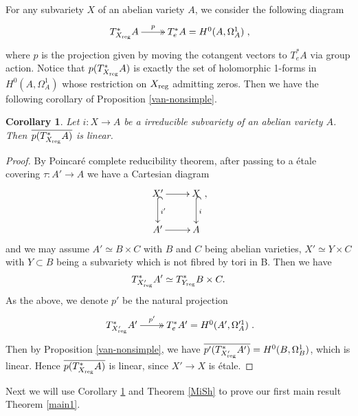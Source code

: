 \documentclass[a4paper,12pt,reqno]{amsart}
\theoremstyle{plain}
\newtheorem{corollary}[theorem]{Corollary}
\theoremstyle{remark}
\renewcommand{\cong}{\simeq}
\begin{document}
For any subvariety $X$ of an abelian variety $A$, we consider the following diagram 
$$\xymatrix{
T^*_{X_{\textnormal{reg}}}A\ar@{->>}[r]^-p& T^*_e A=H^0(A, \Omega_A^1)
},$$ where $p$ is the projection given by moving the cotangent vectors to $T^*_eA$ via group action. Notice that $p(T^*_{X_{\textnormal{reg}}}A)$ is exactly the set of holomorphic 1-forms in $H^0(A, \Omega_A^1)$ whose restriction on $X_{\textnormal{reg}}$ admitting zeros. Then we have the following corollary of Proposition \ref{van-nonsimple}.

\begin{corollary}\label{Main-coro}
Let $i: X\to A$ be a irreducible subvariety of an abelian variety $A$. Then $\overline{p(T^*_{X_{\textnormal{reg}}}A)}$ is linear. 
\end{corollary}


\begin{proof}
By Poincar\'e complete reducibility theorem, after passing to a \'etale covering $\tau:A'\to A$ we have a Cartesian diagram 
$$\xymatrix{
X'\ar[r]\ar@{^{(}->}[d]^-{i'}& X\ar@{^{(}->}[d]^-{i}\\
A'\ar[r]& A},$$ and we may assume $A'\cong B\times C$ with $B$ and $C$ being abelian varieties, $X'\cong Y\times C$ with $Y\subset B$ being a subvariety which is not fibred by tori in B. Then we have $$T^*_{X'_{\textnormal{reg}}}A'\cong T^*_{Y_{\textnormal{reg}}}B\times C.$$ As the above, we denote $p'$ be the natural projection $$\xymatrix{
T^*_{X'_{\textnormal{reg}}}A'\ar@{->>}[r]^-{p'}& T^*_e A'=H^0(A', \Omega_A'^1)
}.$$  Then by Proposition \ref{van-nonsimple}, we have $\overline{p'(T^*_{X'_{\textnormal{reg}}}A')}=H^0(B, \Omega_B^1)$, which is linear. Hence $\overline{p(T^*_{X_{\textnormal{reg}}}A)}$ is linear, since $X'\to X$ is \'etale.
\end{proof}

Next we will use Corollary \ref{Main-coro} and Theorem \ref{MiSh} to prove our first main result Theorem \ref{main1}.
\end{document}
